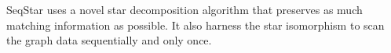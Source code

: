
SeqStar uses a novel star decomposition algorithm that preserves as much matching information as possible.
It also harness the star isomorphism to scan the graph data sequentially and only once.

